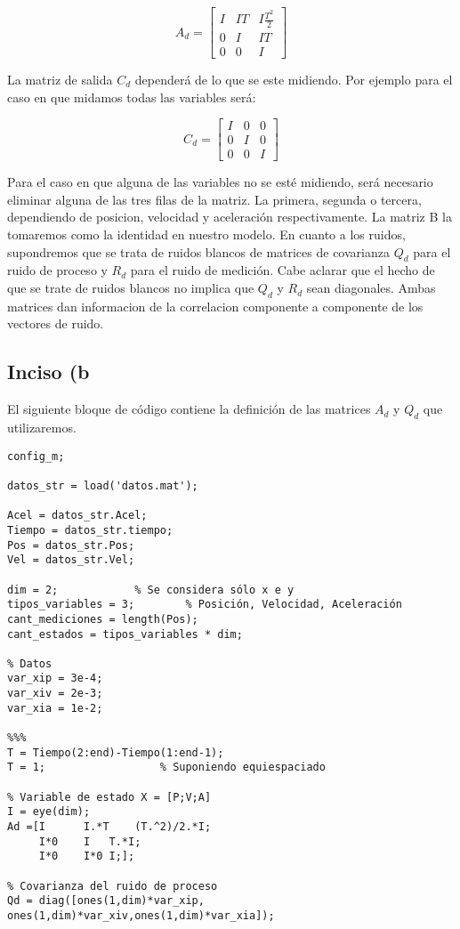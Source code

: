 		\begin{equation*}
			A_{d} = \begin{bmatrix} I & IT & I\frac{T^2}{2} \\[0.3em] 0 & I & IT \\[0.3em] 0 & 0 & I \end{bmatrix}
		\end{equation*}

	La matriz de salida $C_{d}$ dependerá de lo que se este midiendo. Por ejemplo para el caso en que midamos todas las variables será:
	
		\begin{equation*}
			C_{d} = \begin{bmatrix} I & 0 & 0 \\[0.3em] 0 & I & 0 \\[0.3em] 0 & 0 & I \end{bmatrix}
		\end{equation*}
		
	Para el caso en que alguna de las variables no se esté midiendo, será necesario eliminar alguna de las tres filas de la matriz. La primera, segunda o tercera, dependiendo de posicion, velocidad y aceleración respectivamente. La matriz B la tomaremos como la identidad en nuestro modelo.
	En cuanto a los ruidos, supondremos que se trata de ruidos blancos de matrices de covarianza $Q_{d}$ para el ruido de proceso y $R_{d}$ para el ruido de medición. Cabe aclarar que el hecho de que se trate de ruidos blancos no implica que $Q_{d}$ y $R_{d}$ sean diagonales. Ambas matrices dan informacion de la correlacion componente a componente de los vectores de ruido.
	
\subsection{Inciso (b}

	El siguiente bloque de código contiene la definición de las matrices $A_{d}$ y $Q_{d}$ que utilizaremos.

	\begin{lstlisting}
config_m;

datos_str = load('datos.mat');

Acel = datos_str.Acel;
Tiempo = datos_str.tiempo;
Pos = datos_str.Pos;
Vel = datos_str.Vel;

dim = 2;			% Se considera sólo x e y
tipos_variables = 3;		% Posición, Velocidad, Aceleración
cant_mediciones = length(Pos);
cant_estados = tipos_variables * dim;

% Datos
var_xip = 3e-4;
var_xiv = 2e-3;
var_xia = 1e-2;

%%%
T = Tiempo(2:end)-Tiempo(1:end-1);	
T = 1;					% Suponiendo equiespaciado

% Variable de estado X = [P;V;A]
I = eye(dim);
Ad =[I		I.*T	(T.^2)/2.*I;
     I*0	I	T.*I;
     I*0	I*0	I;];

% Covarianza del ruido de proceso
Qd = diag([ones(1,dim)*var_xip, ones(1,dim)*var_xiv,ones(1,dim)*var_xia]);
	\end{lstlisting}
	
